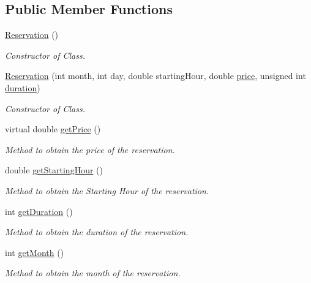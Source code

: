 \subsection*{Public Member Functions}
\begin{DoxyCompactItemize}
\item 
\mbox{\label{class_reservation_a63b283053695e6f50fa44c50da2b3de5}} 
\mbox{\hyperlink{class_reservation_a63b283053695e6f50fa44c50da2b3de5}{Reservation}} ()
\begin{DoxyCompactList}\small\item\em Constructor of Class. \end{DoxyCompactList}\item 
\mbox{\hyperlink{class_reservation_a917852588c2eca452e19b59a18fb372c}{Reservation}} (int month, int day, double starting\+Hour, double \mbox{\hyperlink{class_reservation_a82e197bd30e7949ee9b8616ee4eacf83}{price}}, unsigned int \mbox{\hyperlink{class_reservation_a1a311bb23edebfa226f9c744aefdc7b1}{duration}})
\begin{DoxyCompactList}\small\item\em Constructor of Class. \end{DoxyCompactList}\item 
virtual double \mbox{\hyperlink{class_reservation_a62cdb2f1a24e2fce92fb9f024ae9f494}{get\+Price}} ()
\begin{DoxyCompactList}\small\item\em Method to obtain the price of the reservation. \end{DoxyCompactList}\item 
double \mbox{\hyperlink{class_reservation_a28da7b16dadfeb33bf5351cabc8dbb0b}{get\+Starting\+Hour}} ()
\begin{DoxyCompactList}\small\item\em Method to obtain the Starting Hour of the reservation. \end{DoxyCompactList}\item 
int \mbox{\hyperlink{class_reservation_a9d91ef1230af46952cb5422ae769bfa1}{get\+Duration}} ()
\begin{DoxyCompactList}\small\item\em Method to obtain the duration of the reservation. \end{DoxyCompactList}\item 
int \mbox{\hyperlink{class_reservation_adbc454654e7e861d80c8740f85e0fb10}{get\+Month}} ()
\begin{DoxyCompactList}\small\item\em Method to obtain the month of the reservation. \end{DoxyCompactList}\item 

\end{DoxyCompactItemize}
